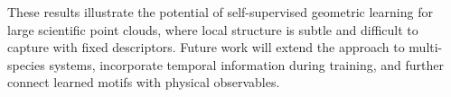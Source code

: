 \documentclass[runningheads]{llncs}
\begin{document}
These results illustrate the potential of self-supervised geometric learning for large scientific point clouds, where local structure is subtle and difficult to capture with fixed descriptors. Future work will extend the approach to multi-species systems, incorporate temporal information during training, and further connect learned motifs with physical observables.



\end{document}
